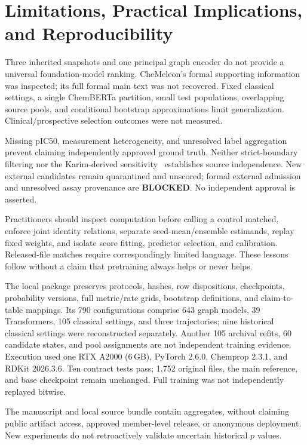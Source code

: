 \documentclass[runningheads,a4paper]{llncs}
\begin{document}
\section{Limitations, Practical Implications, and Reproducibility}
Three inherited snapshots and one principal graph encoder do not provide a universal foundation-model ranking. CheMeleon's formal supporting information was inspected; its full formal main text was not recovered. Fixed classical settings, a single ChemBERTa partition, small test populations, overlapping source pools, and conditional bootstrap approximations limit generalization. Clinical/prospective selection outcomes were not measured.

Missing pIC50, measurement heterogeneity, and unresolved label aggregation prevent claiming independently approved ground truth. Neither strict-boundary filtering nor the Karim-derived sensitivity~\cite{karim2021cardiotox} establishes source independence. New external candidates remain quarantined and unscored; formal external admission and unresolved assay provenance are \textbf{BLOCKED}. No independent approval is asserted.

Practitioners should inspect computation before calling a control matched, enforce joint identity relations, separate seed-mean/ensemble estimands, replay fixed weights, and isolate score fitting, predictor selection, and calibration. Released-file matches require correspondingly limited language. These lessons follow without a claim that pretraining always helps or never helps.

The local package preserves protocols, hashes, row dispositions, checkpoints, probability versions, full metric/rate grids, bootstrap definitions, and claim-to-table mappings. Its 790 configurations comprise 643 graph models, 39 Transformers, 105 classical settings, and three trajectories; nine historical classical settings were reconstructed separately. Another 105 archival refits, 60 candidate states, and pool assignments are not independent training evidence. Execution used one RTX A2000 (6\,GB), PyTorch 2.6.0, Chemprop 2.3.1, and RDKit 2026.3.6. Ten contract tests pass; 1,752 original files, the main reference, and base checkpoint remain unchanged. Full training was not independently replayed bitwise.

The manuscript and local source bundle contain aggregates, without claiming public artifact access, approved member-level release, or anonymous deployment. New experiments do not retroactively validate uncertain historical $p$ values.
\end{document}
